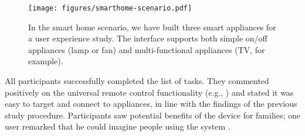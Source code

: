 \begin{figure}[t]
\centering
\texttt{[image: figures/smarthome-scenario.pdf]}
\caption{In the smart home scenario, we have built three smart appliances for a user experience study. The interface supports both simple on/off appliances (lamp or fan) and multi-functional appliances (TV, for example).}
\label{fig:smart-home}
\end{figure}


All participants successfully completed the list of tasks. They commented positively on the universal remote control functionality (e.g., ) and stated it was easy to target and connect to appliances, in line with the findings of the previous study procedure. Participants saw potential benefits of the device for families; one user remarked that he could imagine people using the system .


